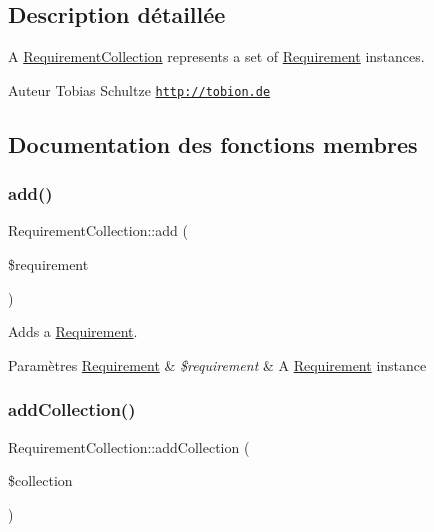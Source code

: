 \subsection{Description détaillée}
A \hyperlink{classRequirementCollection}{Requirement\+Collection} represents a set of \hyperlink{classRequirement}{Requirement} instances.

\begin{DoxyAuthor}{Auteur}
Tobias Schultze \href{http://tobion.de}{\tt http\+://tobion.\+de} 
\end{DoxyAuthor}


\subsection{Documentation des fonctions membres}
\mbox{\label{classRequirementCollection_a16be85daada80688601baf1d4048d4c6}} 
\subsubsection{\texorpdfstring{add()}{add()}}
{\footnotesize\ttfamily Requirement\+Collection\+::add (\begin{DoxyParamCaption}\item[{\hyperlink{classRequirement}{Requirement}}]{\$requirement }\end{DoxyParamCaption})}

Adds a \hyperlink{classRequirement}{Requirement}.


\begin{DoxyParams}[1]{Paramètres}
\hyperlink{classRequirement}{Requirement} & {\em \$requirement} & A \hyperlink{classRequirement}{Requirement} instance \\
\hline
\end{DoxyParams}
\mbox{\label{classRequirementCollection_a4de7d0d4e50130610d6d6d3cadc5c91c}} 
\subsubsection{\texorpdfstring{add\+Collection()}{addCollection()}}
{\footnotesize\ttfamily Requirement\+Collection\+::add\+Collection (\begin{DoxyParamCaption}\item[{\hyperlink{classRequirementCollection}{Requirement\+Collection}}]{\$collection }\end{DoxyParamCaption})}

